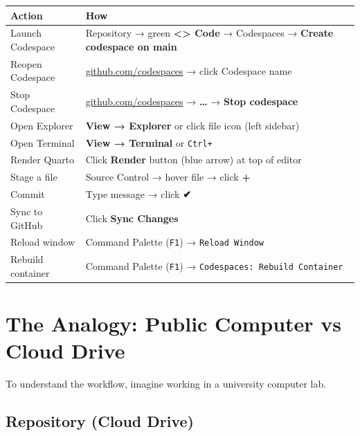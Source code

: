 \documentclass[
  letterpaper,
  DIV=11,
  numbers=noendperiod,
  oneside]{scrreprt}
\begin{document}
\begin{longtable}[]{@{}
  >{\raggedright\arraybackslash}p{}
  >{\raggedright\arraybackslash}p{}@{}}
\toprule\noalign{}
\begin{minipage}[b]{\linewidth}\raggedright
Action
\end{minipage} & \begin{minipage}[b]{\linewidth}\raggedright
How
\end{minipage} \\
\midrule\noalign{}
\endhead
\bottomrule\noalign{}
\endlastfoot
Launch Codespace & Repository → green \textbf{\textless\textgreater{}
Code} → Codespaces → \textbf{Create codespace on main} \\
Reopen Codespace &
\href{https://github.com/codespaces}{github.com/codespaces} → click
Codespace name \\
Stop Codespace &
\href{https://github.com/codespaces}{github.com/codespaces} →
\textbf{\ldots{}} → \textbf{Stop codespace} \\
Open Explorer & \textbf{View → Explorer} or click file icon (left
sidebar) \\
Open Terminal & \textbf{View → Terminal} or
\texttt{Ctrl+\textasciigrave{}} \\
Render Quarto & Click \textbf{Render} button (blue arrow) at top of
editor \\
Stage a file & Source Control → hover file → click \textbf{+} \\
Commit & Type message → click \textbf{✔} \\
Sync to GitHub & Click \textbf{Sync Changes} \\
Reload window & Command Palette (\texttt{F1}) →
\texttt{Reload\ Window} \\
Rebuild container & Command Palette (\texttt{F1}) →
\texttt{Codespaces:\ Rebuild\ Container} \\
\end{longtable}

\chapter{The Analogy: Public Computer vs Cloud
Drive}\label{the-analogy-public-computer-vs-cloud-drive}

To understand the workflow, imagine working in a university computer
lab.

\section{Repository (Cloud Drive)}\label{repository-cloud-drive}
\end{document}
